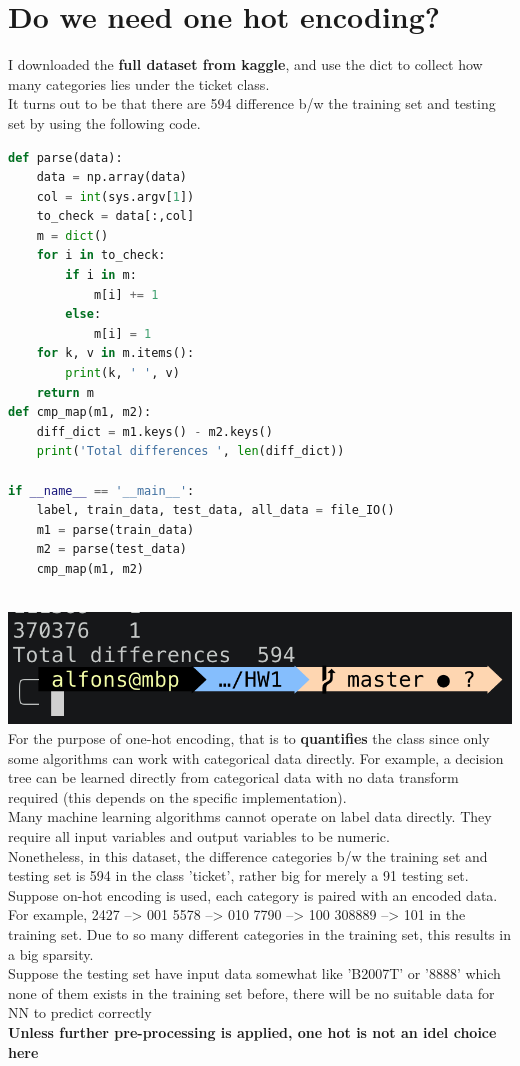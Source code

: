 \documentclass[11pt, a4paper]{article} %
\begin{document}
\section{Do we need one hot encoding?}
I downloaded the \textbf{full dataset from kaggle}, and use the dict to collect how many categories lies under the ticket class.
\\  It turns out to be that there are 594 difference b/w the training set and testing set by using the following code.
\begin{lstlisting}[language = python]
def parse(data):
    data = np.array(data)
    col = int(sys.argv[1])
    to_check = data[:,col]
    m = dict()
    for i in to_check:
        if i in m:
            m[i] += 1
        else:
            m[i] = 1
    for k, v in m.items():
        print(k, ' ', v)
    return m
def cmp_map(m1, m2):
    diff_dict = m1.keys() - m2.keys()
    print('Total differences ', len(diff_dict))

if __name__ == '__main__':
    label, train_data, test_data, all_data = file_IO()
    m1 = parse(train_data)
    m2 = parse(test_data)
    cmp_map(m1, m2)
\end{lstlisting}
\\ \includegraphics[scale = 0.5]{figure_2/diff.png}
\\ For the purpose of one-hot encoding, that is to \textbf{quantifies} the class since only some algorithms can work with categorical data directly. For example, a decision tree can be learned directly from categorical data with no data transform required (this depends on the specific implementation).
\\ Many machine learning algorithms cannot operate on label data directly. They require all input variables and output variables to be numeric.
\\ Nonetheless, in this dataset, the difference categories b/w the training set and testing set is 594 in the class 'ticket', rather big for merely a 91 testing set. Suppose on-hot encoding is used, each category is paired with an encoded data.
\\ For example, 2427 --> 001  5578 --> 010 7790 --> 100 308889 --> 101 in the training set. Due to so many different categories in the training set, this results in a big sparsity. 
\\ Suppose the testing set have input data somewhat like 'B2007T' or '8888' which none of them exists in the training set before, there will be no suitable data for NN to predict correctly
\\ \textbf{Unless further pre-processing is applied, one hot is not an idel choice here}
\end{document}
